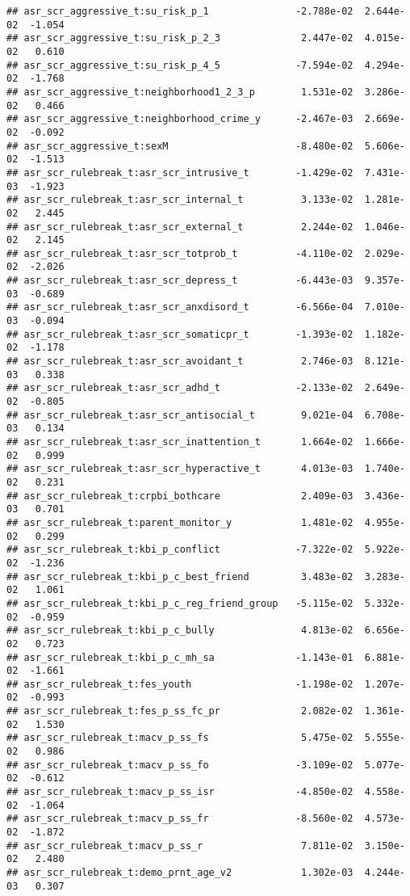 \documentclass[
]{article}
\begin{document}
\begin{verbatim}
## asr_scr_aggressive_t:su_risk_p_1               -2.788e-02  2.644e-02  -1.054
## asr_scr_aggressive_t:su_risk_p_2_3              2.447e-02  4.015e-02   0.610
## asr_scr_aggressive_t:su_risk_p_4_5             -7.594e-02  4.294e-02  -1.768
## asr_scr_aggressive_t:neighborhood1_2_3_p        1.531e-02  3.286e-02   0.466
## asr_scr_aggressive_t:neighborhood_crime_y      -2.467e-03  2.669e-02  -0.092
## asr_scr_aggressive_t:sexM                      -8.480e-02  5.606e-02  -1.513
## asr_scr_rulebreak_t:asr_scr_intrusive_t        -1.429e-02  7.431e-03  -1.923
## asr_scr_rulebreak_t:asr_scr_internal_t          3.133e-02  1.281e-02   2.445
## asr_scr_rulebreak_t:asr_scr_external_t          2.244e-02  1.046e-02   2.145
## asr_scr_rulebreak_t:asr_scr_totprob_t          -4.110e-02  2.029e-02  -2.026
## asr_scr_rulebreak_t:asr_scr_depress_t          -6.443e-03  9.357e-03  -0.689
## asr_scr_rulebreak_t:asr_scr_anxdisord_t        -6.566e-04  7.010e-03  -0.094
## asr_scr_rulebreak_t:asr_scr_somaticpr_t        -1.393e-02  1.182e-02  -1.178
## asr_scr_rulebreak_t:asr_scr_avoidant_t          2.746e-03  8.121e-03   0.338
## asr_scr_rulebreak_t:asr_scr_adhd_t             -2.133e-02  2.649e-02  -0.805
## asr_scr_rulebreak_t:asr_scr_antisocial_t        9.021e-04  6.708e-03   0.134
## asr_scr_rulebreak_t:asr_scr_inattention_t       1.664e-02  1.666e-02   0.999
## asr_scr_rulebreak_t:asr_scr_hyperactive_t       4.013e-03  1.740e-02   0.231
## asr_scr_rulebreak_t:crpbi_bothcare              2.409e-03  3.436e-03   0.701
## asr_scr_rulebreak_t:parent_monitor_y            1.481e-02  4.955e-02   0.299
## asr_scr_rulebreak_t:kbi_p_conflict             -7.322e-02  5.922e-02  -1.236
## asr_scr_rulebreak_t:kbi_p_c_best_friend         3.483e-02  3.283e-02   1.061
## asr_scr_rulebreak_t:kbi_p_c_reg_friend_group   -5.115e-02  5.332e-02  -0.959
## asr_scr_rulebreak_t:kbi_p_c_bully               4.813e-02  6.656e-02   0.723
## asr_scr_rulebreak_t:kbi_p_c_mh_sa              -1.143e-01  6.881e-02  -1.661
## asr_scr_rulebreak_t:fes_youth                  -1.198e-02  1.207e-02  -0.993
## asr_scr_rulebreak_t:fes_p_ss_fc_pr              2.082e-02  1.361e-02   1.530
## asr_scr_rulebreak_t:macv_p_ss_fs                5.475e-02  5.555e-02   0.986
## asr_scr_rulebreak_t:macv_p_ss_fo               -3.109e-02  5.077e-02  -0.612
## asr_scr_rulebreak_t:macv_p_ss_isr              -4.850e-02  4.558e-02  -1.064
## asr_scr_rulebreak_t:macv_p_ss_fr               -8.560e-02  4.573e-02  -1.872
## asr_scr_rulebreak_t:macv_p_ss_r                 7.811e-02  3.150e-02   2.480
## asr_scr_rulebreak_t:demo_prnt_age_v2            1.302e-03  4.244e-03   0.307

\end{verbatim}
\end{document}
